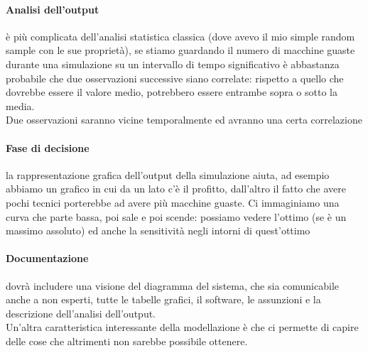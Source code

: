 \documentclass{article}
\begin{document}
\paragraph{Analisi dell'output}è più complicata dell'analisi statistica classica (dove avevo il mio simple random sample con le sue proprietà), se stiamo guardando il numero di macchine guaste durante una simulazione su un intervallo di tempo significativo è abbastanza probabile che due osservazioni successive siano correlate: rispetto a quello che dovrebbe essere il valore medio, potrebbero essere entrambe sopra o sotto la media.\\ Due osservazioni saranno vicine temporalmente ed avranno una certa correlazione
\paragraph{Fase di decisione}la rappresentazione grafica dell'output della simulazione aiuta, ad esempio abbiamo un grafico in cui da un lato c'è il profitto, dall'altro il fatto che avere pochi tecnici porterebbe ad avere più macchine guaste. Ci immaginiamo una curva che parte bassa, poi sale e poi scende: possiamo vedere l'ottimo (se è un massimo assoluto) ed anche la sensitività negli intorni di quest'ottimo
\paragraph{Documentazione} dovrà includere una visione del diagramma del sistema, che sia comunicabile anche a non esperti, tutte le tabelle grafici, il software, le assunzioni e la descrizione dell'analisi dell'output.\\ Un'altra caratteristica interessante della modellazione è che ci permette di capire delle cose che altrimenti non sarebbe possibile ottenere.
\end{document}
